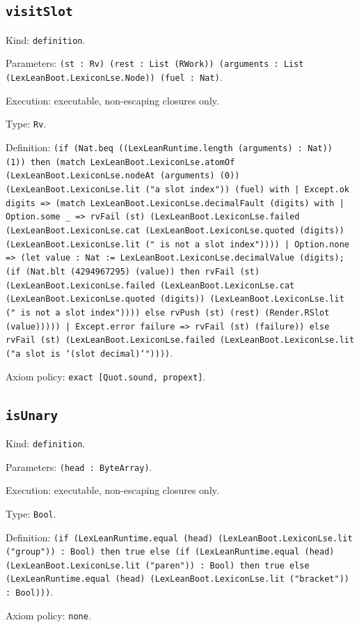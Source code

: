 \documentclass[11pt]{article}
\begin{document}
\subsection*{\texttt{visitSlot}}
\noindent Kind: \texttt{definition}.\par
\noindent Parameters: \texttt{(st : Rv) (rest : List (RWork)) (arguments : List (LexLeanBoot.LexiconLse.Node)) (fuel : Nat)}.\par
\noindent Execution: executable, non-escaping closures only.\par
\noindent Type: \texttt{Rv}.\par
\noindent Definition: \texttt{(if (Nat.beq ((LexLeanRuntime.length (arguments) : Nat)) (1)) then (match LexLeanBoot.LexiconLse.atomOf (LexLeanBoot.LexiconLse.nodeAt (arguments) (0)) (LexLeanBoot.LexiconLse.lit ("a slot index")) (fuel) with | Except.ok digits => (match LexLeanBoot.LexiconLse.decimalFault (digits) with | Option.some \_ => rvFail (st) (LexLeanBoot.LexiconLse.failed (LexLeanBoot.LexiconLse.cat (LexLeanBoot.LexiconLse.quoted (digits)) (LexLeanBoot.LexiconLse.lit (" is not a slot index")))) | Option.none => (let value : Nat := LexLeanBoot.LexiconLse.decimalValue (digits); (if (Nat.blt (4294967295) (value)) then rvFail (st) (LexLeanBoot.LexiconLse.failed (LexLeanBoot.LexiconLse.cat (LexLeanBoot.LexiconLse.quoted (digits)) (LexLeanBoot.LexiconLse.lit (" is not a slot index")))) else rvPush (st) (rest) (Render.RSlot (value))))) | Except.error failure => rvFail (st) (failure)) else rvFail (st) (LexLeanBoot.LexiconLse.failed (LexLeanBoot.LexiconLse.lit ("a slot is `(slot decimal)`"))))}.\par
\noindent Axiom policy: \texttt{exact [Quot.sound, propext]}.\par
\subsection*{\texttt{isUnary}}
\noindent Kind: \texttt{definition}.\par
\noindent Parameters: \texttt{(head : ByteArray)}.\par
\noindent Execution: executable, non-escaping closures only.\par
\noindent Type: \texttt{Bool}.\par
\noindent Definition: \texttt{(if (LexLeanRuntime.equal (head) (LexLeanBoot.LexiconLse.lit ("group")) : Bool) then true else (if (LexLeanRuntime.equal (head) (LexLeanBoot.LexiconLse.lit ("paren")) : Bool) then true else (LexLeanRuntime.equal (head) (LexLeanBoot.LexiconLse.lit ("bracket")) : Bool)))}.\par
\noindent Axiom policy: \texttt{none}.\par
\end{document}
